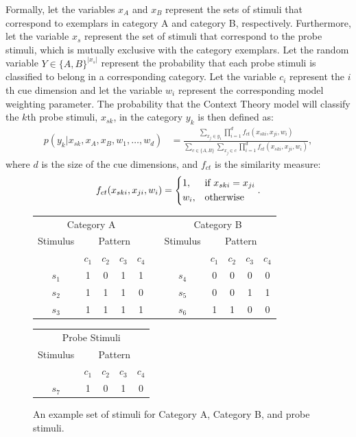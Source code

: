 \documentclass{article}
\begin{document}
Formally, let the variables $x_A$ and $x_B$ represent the sets of stimuli that correspond to exemplars in category A and category B, respectively. Furthermore, let the variable $x_s$ represent the set of stimuli that correspond to the probe stimuli, which is mutually exclusive with the category exemplars. Let the random variable $Y \in \{A,B\}^{|x_s|}$ represent the probability that each probe stimuli is classified to belong in a corresponding category. Let the variable $c_i$ represent the $i$th cue dimension and let the variable $w_i$ represent the corresponding model weighting parameter. The probability that the Context Theory model will classify the $k$th probe stimuli, $x_{sk}$, in the category $y_k$ is then defined as:
\begin{align}
    p(y_k | x_{sk}, x_A, x_B, w_1, \dots, w_d) &= \frac{\sum\limits_{x_j \in y_1} \prod\limits_{i=1}^d f_{ct}(x_{ski}, x_{ji}, w_i)}{\sum\limits_{c \in \{A,B\}}\sum\limits_{x_j \in c} \prod\limits_{i=1}^d f_{ct}(x_{ski}, x_{ji}, w_i)}, \label{eq:ct_base}
\end{align}
where $d$ is the size of the cue dimensions, and $f_{ct}$ is the similarity measure:
\begin{align}
    f_{ct}(x_{ski}, x_{ji}, w_i) = 
        \begin{dcases}
            1  , & \text{if } x_{ski} = x_{ji}\\
            w_i, & \text{otherwise}
        \end{dcases}.
\end{align}

\begin{figure}[h]
\hspace{1cm}
\begin{tabular}{ccccccccccc}
\multicolumn{5}{c}{Category A} & \hspace{1cm} & \multicolumn{5}{c}{Category B} \\
Stimulus & \multicolumn{4}{c}{Pattern} & & Stimulus & \multicolumn{4}{c}{Pattern} \\
  & $c_1$ & $c_2$ & $c_3$ & $c_4$ & & & $c_1$ & $c_2$ & $c_3$ & $c_4$  \\ \cline{2-5} \cline{8-11}
$s_1$ & 1 & 0 & 1 & 1 & & $s_4$ & 0 & 0 & 0 & 0 \\
$s_2$ & 1 & 1 & 1 & 0 & & $s_5$ & 0 & 0 & 1 & 1 \\
$s_3$ & 1 & 1 & 1 & 1 & & $s_6$ & 1 & 1 & 0 & 0 
\end{tabular}
\vspace{1cm}
\newline
\begin{tabular}{ccccc}
\multicolumn{5}{c}{Probe Stimuli} \\
Stimulus & \multicolumn{4}{c}{Pattern} \\
  & $c_1$ & $c_2$ & $c_3$ & $c_4$ \\ \cline{2-5} 
$s_7$ & 1 & 0 & 1 & 0 
\end{tabular}
\centering
\caption{An example set of stimuli for Category A, Category B, and probe stimuli.}
\label{fig:cat_example}
\end{figure}
\end{document}
